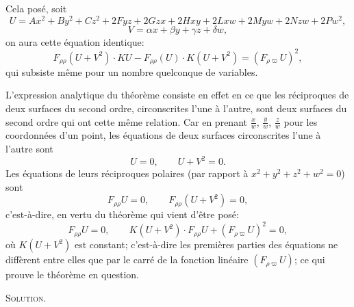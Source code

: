 \documentclass[11pt]{article}
\begin{document}
\smallskip
\noindent Cela pos\'e, soit
\[
U = A x^{2} + B y^{2} + C z^{2} + 2 F y z + 2 G z x + 2 H x y + 2 L x w + 2 M y w + 2 N z w + 2 P w^{2} \tag{3},
\]
\[
V = \alpha x + \beta y + \gamma z + \delta w, \tag{4}
\]
on aura cette \'equation identique:
\[
F_{\rho\rho}(U + V^{2}) \cdot K U - F_{\rho\rho}(U) \cdot K(U + V^{2}) = (F_{\rho\varpi} U)^{2} \tag{5},
\]
qui subsiste m\^eme pour un nombre quelconque de variables.

\smallskip
L'expression analytique du th\'eor\`eme consiste en effet en ce que les r\'eciproques
de deux surfaces du second ordre, circonscrites l'une \`a l'autre, sont deux surfaces du
second ordre qui ont cette m\^eme relation. Car en prenant $\frac{x}{w}$, $\frac{y}{w}$, $\frac{z}{w}$ pour les coordonn\'ees
d'un point, les \'equations de deux surfaces circonscrites l'une \`a l'autre sont
\[
U = 0, \qquad U + V^{2} = 0. \tag{6}
\]
Les \'equations de leurs r\'eciproques polaires (par rapport \`a $x^{2}+y^{2}+z^{2}+w^{2}=0$) sont
\[
F_{\rho\rho} U = 0, \qquad F_{\rho\rho}(U + V^{2}) = 0,
\]
c'est-\`a-dire, en vertu du th\'eor\`eme qui vient d'\^etre pos\'e:
\[
F_{\rho\rho} U = 0, \qquad K(U + V^{2}) \cdot F_{\rho\rho} U + (F_{\rho\varpi} U)^{2} = 0 \tag{7},
\]
o\`u $K(U + V^{2})$ est constant; c'est-\`a-dire les premi\`eres parties des \'equations ne diff\`erent
entre elles que par le carr\'e de la fonction lin\'eaire $(F_{\rho\varpi} U)$; ce qui prouve le th\'eor\`eme
en question.

\medskip
\noindent\textsc{Solution.}
\end{document}
